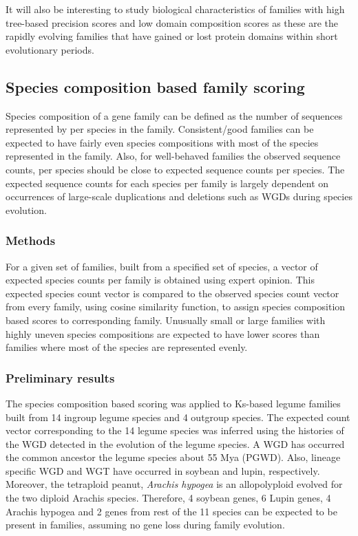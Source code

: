 \documentclass{article}
\begin{document}
	It will also be interesting to study biological characteristics of families with high tree-based precision scores and low domain composition scores as these are the rapidly evolving families that have gained or lost protein domains within short evolutionary periods.
	
	
	\subsection{Species composition based family scoring}
	Species composition of a gene family can be defined as the number of sequences represented by per species in the family. Consistent/good families can be expected to have fairly even species compositions with most of the species represented in the family. Also, for well-behaved families the observed sequence counts, per species should be close to expected sequence counts per species. The expected sequence counts for each species per family is largely dependent on occurrences of large-scale duplications and deletions such as WGDs during species evolution.
		
		\subsubsection{Methods}
		For a given set of families, built from a specified set of species, a vector of expected species counts per family is obtained using expert opinion. This expected species count vector is compared to the observed species count vector from every family, using cosine similarity function, to assign species composition based scores to corresponding family. Unusually small or large families with highly uneven species compositions are expected to have lower scores than families where most of the species are represented evenly.
		
		\subsubsection{Preliminary results}
		The species composition based scoring  was applied to Ks-based legume families built from 14 ingroup legume species and 4 outgroup species. The expected count vector corresponding to the 14 legume species was inferred using the histories of the WGD detected in the evolution of the legume species. A WGD has occurred the common ancestor the legume species about 55 Mya (PGWD). Also, lineage specific  WGD and WGT have occurred in soybean and lupin, respectively. Moreover, the tetraploid peanut, \textit{Arachis hypogea} is an allopolyploid evolved for the two diploid Arachis species. Therefore, 4 soybean genes, 6 Lupin genes, 4 Arachis hypogea and 2 genes from rest of the 11 species can be expected to be present in families, assuming no gene loss during family evolution.
		
\end{document}
